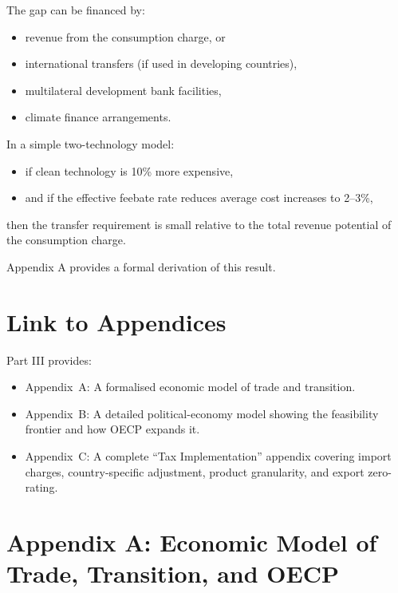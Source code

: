 \documentclass[12pt]{article}
\begin{document}
The gap can be financed by:
\begin{itemize}
    \item revenue from the consumption charge, or
    \item international transfers (if used in developing countries),
    \item multilateral development bank facilities,
    \item climate finance arrangements.
\end{itemize}

In a simple two-technology model:
\begin{itemize}
    \item if clean technology is 10\% more expensive,
    \item and if the effective feebate rate reduces average cost increases to 2--3\%,
\end{itemize}
then the transfer requirement is small relative to the total revenue potential of
the consumption charge.

Appendix A provides a formal derivation of this result.


\section{Link to Appendices}

Part III provides:
\begin{itemize}
    \item Appendix~A: A formalised economic model of trade and transition.
    \item Appendix~B: A detailed political-economy model showing the feasibility
    frontier and how OECP expands it.
    \item Appendix~C: A complete ``Tax Implementation'' appendix covering import
    charges, country-specific adjustment, product granularity, and export zero-rating.
\end{itemize}


\appendix

\section{Appendix A: Economic Model of Trade, Transition, and OECP}
\end{document}
